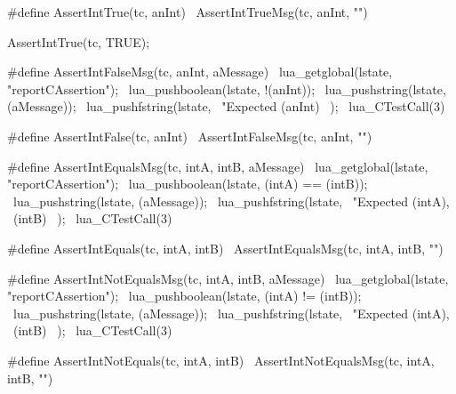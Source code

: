#define AssertIntTrue(tc, anInt) \
  AssertIntTrueMsg(tc, anInt, "")
\stopCHeader

\startCTest
  AssertIntTrue(tc, TRUE);
\stopCTest
\stopTestCase
\stopTestSuite

\startTestSuite[assertIntFalse]

\startCHeader
#define AssertIntFalseMsg(tc, anInt, aMessage) \
  lua_getglobal(lstate, "reportCAssertion");   \
  lua_pushboolean(lstate, !(anInt));           \
  lua_pushstring(lstate, (aMessage));          \
  lua_pushfstring(lstate,                      \
      "Expected %
      (anInt)                                  \
    );                                         \
  lua_CTestCall(3)

#define AssertIntFalse(tc, anInt) \
  AssertIntFalseMsg(tc, anInt, "")
\stopCHeader

\stopTestSuite

\startTestSuite[assertIntEquals]

\startCHeader
#define AssertIntEqualsMsg(tc, intA, intB, aMessage) \
  lua_getglobal(lstate, "reportCAssertion");         \
  lua_pushboolean(lstate, (intA) == (intB));         \
  lua_pushstring(lstate, (aMessage));                \
  lua_pushfstring(lstate,                            \
      "Expected %
      (intA),                                        \
      (intB)                                         \
    );                                               \
  lua_CTestCall(3)

#define AssertIntEquals(tc, intA, intB) \
  AssertIntEqualsMsg(tc, intA, intB, "")
\stopCHeader

\stopTestSuite

\startTestSuite[assertIntNotEquals]

\startCHeader
#define AssertIntNotEqualsMsg(tc, intA, intB, aMessage) \
  lua_getglobal(lstate, "reportCAssertion");            \
  lua_pushboolean(lstate, (intA) != (intB));            \
  lua_pushstring(lstate, (aMessage));                   \
  lua_pushfstring(lstate,                               \
      "Expected %
      (intA),                                           \
      (intB)                                            \
    );                                                  \
  lua_CTestCall(3)

#define AssertIntNotEquals(tc, intA, intB) \
  AssertIntNotEqualsMsg(tc, intA, intB, "")
\stopCHeader

